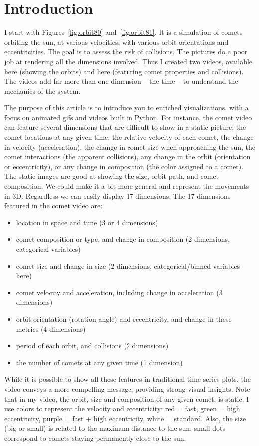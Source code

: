 \documentclass[oneside,10pt]{book}
\begin{document}
\section{Introduction}\label{vizintro}

I start with Figures~\ref{fig:orbit80} and~\ref{fig:orbit81}. It is a simulation of comets orbiting the sun, at various velocities, with various orbit orientations and eccentricities. The goal is to assess the risk of collisions. The pictures do a poor job at rendering all the dimensions involved. Thus I created two videos,
available \href{https://www.youtube.com/watch?v=GD_ZPb48lmk}{here} (showing the orbits) and \href{https://www.youtube.com/watch?v=CeYmsBdfrHM}{here} (featuring comet properties and collisions). The videos add far more than one dimension -- the time -- to understand the mechanics of the system. 

The purpose of this article is to introduce you to enriched visualizations, with a focus on animated gifs and videos built in Python. 
For instance, the comet video can feature several dimensions that are difficult to show in a static picture: the comet locations at any given time, the relative velocity of each comet, 
the change in velocity (acceleration), the change in comet size when approaching the sun,  the comet interactions (the apparent collisions), any change in the orbit (orientation or eccentricity), or any change in composition (the color assigned to a comet). The static images are good at showing the size, orbit path, and comet composition. We could make it a bit more general and represent the movements in 3D. Regardless we can easily display  17 dimensions. The 17 dimensions featured in the comet video are:
\begin{itemize}
\item location in space and time (3 or 4 dimensions)
\item comet composition or type, and change in composition (2 dimensions, categorical variables)
\item comet size and change in size (2 dimensions, categorical/binned variables here)
\item comet velocity and acceleration, including change in acceleration (3 dimensions)
\item orbit orientation (rotation angle) and eccentricity, and change in these metrics (4 dimensions)
\item period of each orbit, and collisions (2 dimensions)
\item the number of comets at any given time (1 dimension)
\end{itemize}
\vspace{1ex}
While it is possible to show all these features in traditional time series plots, the video conveys a more compelling message, providing strong visual insights. Note that in my video, the orbit, size and composition of any given comet, is static.  I use colors to represent the velocity and eccentricity: red = fast, green = high eccentricity, purple = fast + high eccentricity, white = standard. Also, the size (big or small) is related to the maximum distance to the sun: small dots correspond to comets staying permanently close to the sun.
\end{document}
